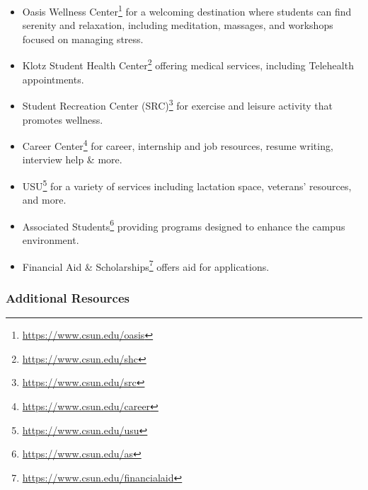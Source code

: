 \documentclass[
  letterpaper,
  DIV=11,
  numbers=noendperiod,
  oneside]{scrartcl}
\DeclareRobustCommand{\href}[2]{#2\footnote{\url{#1}}}
\begin{document}
\begin{itemize}
\item
  \href{https://www.csun.edu/oasis}{Oasis Wellness Center} for a
  welcoming destination where students can find serenity and relaxation,
  including meditation, massages, and workshops focused on managing
  stress.
\item
  \href{https://www.csun.edu/shc}{Klotz Student Health Center} offering
  medical services, including Telehealth appointments.
\item
  \href{https://www.csun.edu/src}{Student Recreation Center (SRC)} for
  exercise and leisure activity that promotes wellness.
\item
  \href{https://www.csun.edu/career}{Career Center} for career,
  internship and job resources, resume writing, interview help \& more.
\item
  \href{https://www.csun.edu/usu}{USU} for a variety of services
  including lactation space, veterans' resources, and more.
\item
  \href{https://www.csun.edu/as}{Associated Students} providing programs
  designed to enhance the campus environment.
\item
  \href{https://www.csun.edu/financialaid}{Financial Aid \&
  Scholarships} offers aid for applications.
\end{itemize}

\hypertarget{additional-resources-1}{%
\subsubsection{\texorpdfstring{\textbf{Additional
Resources}}{Additional Resources}}\label{additional-resources-1}}
\end{document}
